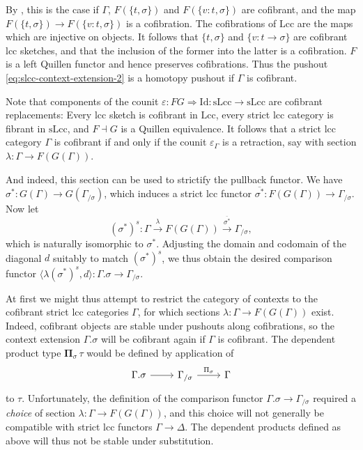 \documentclass[a4paper]{article}
\theoremstyle{remark}
\theoremstyle{definition}
\begin{document}
By \citet[Proposition A.2.4.4]{higher-topos-theory}, this is the case if $\Gamma$, $F(\{t, \sigma\})$ and $F(\{v : t, \sigma\})$ are cofibrant, and the map $F(\{t, \sigma\}) \rightarrow F(\{v : t, \sigma\})$ is a cofibration.
The cofibrations of $\mathrm{Lcc}$ are the maps which are injective on objects.
It follows that $\{t, \sigma\}$ and $\{ v : t \rightarrow \sigma\}$ are cofibrant lcc sketches, and that the inclusion of the former into the latter is a cofibration.
$F$ is a left Quillen functor and hence preserves cofibrations.
Thus the pushout \eqref{eq:slcc-context-extension-2} is a homotopy pushout if $\Gamma$ is cofibrant.

Note that components of the counit $\varepsilon : FG \Rightarrow \mathrm{Id} : \mathrm{sLcc} \rightarrow \mathrm{sLcc}$ are cofibrant replacements:
Every lcc sketch is cofibrant in $\mathrm{Lcc}$, every strict lcc category is fibrant in $\mathrm{sLcc}$, and $F \dashv G$ is a Quillen equivalence.
It follows that a strict lcc category $\Gamma$ is cofibrant if and only if the counit $\varepsilon_\Gamma$ is a retraction, say with section $\lambda : \Gamma \rightarrow F(G(\Gamma))$.

And indeed, this section can be used to strictify the pullback functor.
We have $\sigma^* : G(\Gamma) \rightarrow G(\Gamma_{/ \sigma})$, which induces a strict lcc functor $\overline{\sigma^*} : F(G(\Gamma)) \rightarrow \Gamma_{/ \sigma}$.
Now let
\begin{equation}
  (\sigma^*)^s : \Gamma \xrightarrow{\lambda} F(G(\Gamma)) \xrightarrow{\overline{\sigma^*}} \Gamma_{/ \sigma},
\end{equation}
which is naturally isomorphic to $\sigma^*$.
Adjusting the domain and codomain of the diagonal $d$ suitably to match $(\sigma^*)^s$, we thus obtain the desired comparison functor $\langle \lambda (\sigma^*)^s, d \rangle : \Gamma.\sigma \rightarrow \Gamma_{/ \sigma}$.

At first we might thus attempt to restrict the category of contexts to the cofibrant strict lcc categories $\Gamma$, for which sections $\lambda : \Gamma \rightarrow F(G(\Gamma))$ exist.
Indeed, cofibrant objects are stable under pushouts along cofibrations, so the context extension $\Gamma.\sigma$ will be cofibrant again if $\Gamma$ is cofibrant.
The dependent product type $\mathbf{\Pi}_\sigma \, \tau$ would be defined by application of
\begin{equation}
  \begin{tikzcd}
    \Gamma.\sigma \arrow[r] & \Gamma_{/ \sigma} \arrow[r, "\Pi_\sigma"] & \Gamma
  \end{tikzcd}
\end{equation}
to $\tau$.
Unfortunately, the definition of the comparison functor $\Gamma.\sigma \rightarrow \Gamma_{/ \sigma}$ required a \emph{choice} of section $\lambda : \Gamma \rightarrow F(G(\Gamma))$, and this choice will not generally be compatible with strict lcc functors $\Gamma \rightarrow \Delta$.
The dependent products defined as above will thus not be stable under substitution.
\end{document}
